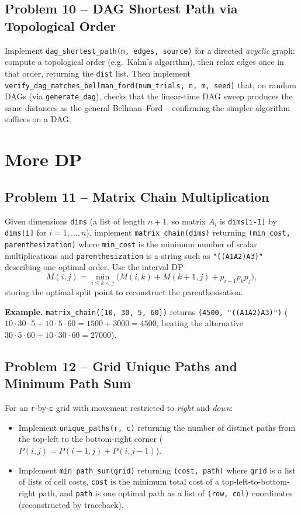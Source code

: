 \documentclass[11pt]{article}
\begin{document}
\subsection*{Problem 10 -- DAG Shortest Path via Topological Order}

Implement \texttt{dag\_shortest\_path(n, edges, source)} for a directed \emph{acyclic} graph:
compute a topological order (e.g.\ Kahn's algorithm), then relax edges once in that order,
returning the \texttt{dist} list. Then implement
\texttt{verify\_dag\_matches\_bellman\_ford(num\_trials, n, m, seed)} that, on random DAGs
(via \texttt{generate\_dag}), checks that the linear-time DAG sweep produces the same
distances as the general Bellman--Ford -- confirming the simpler algorithm suffices on a DAG.

\newpage
\section{More DP}

\subsection*{Problem 11 -- Matrix Chain Multiplication}

Given dimensions \texttt{dims} (a list of length $n+1$, so matrix $A_i$ is
\texttt{dims[i-1]} by \texttt{dims[i]} for $i = 1, \ldots, n$), implement
\texttt{matrix\_chain(dims)} returning \texttt{(min\_cost, parenthesization)} where
\texttt{min\_cost} is the minimum number of scalar multiplications and
\texttt{parenthesization} is a string such as \texttt{"((A1A2)A3)"} describing one optimal
order. Use the interval DP
\[
M(i,j) = \min_{i\le k<j}\big( M(i,k) + M(k+1,j) + p_{i-1}p_k p_j\big),
\]
storing the optimal split point to reconstruct the parenthesisation.

\textbf{Example.} \texttt{matrix\_chain([10, 30, 5, 60])} returns
\texttt{(4500, "((A1A2)A3)")} ($10\cdot30\cdot5 + 10\cdot5\cdot60 = 1500 + 3000 = 4500$,
beating the alternative $30\cdot5\cdot60 + 10\cdot30\cdot60 = 27000$).

\subsection*{Problem 12 -- Grid Unique Paths and Minimum Path Sum}

For an \texttt{r}-by-\texttt{c} grid with movement restricted to \emph{right} and
\emph{down}:
\begin{itemize}
    \item Implement \texttt{unique\_paths(r, c)} returning the number of distinct paths from
    the top-left to the bottom-right corner ($P(i,j) = P(i-1,j) + P(i,j-1)$).
    \item Implement \texttt{min\_path\_sum(grid)} returning \texttt{(cost, path)} where
    \texttt{grid} is a list of lists of cell costs, \texttt{cost} is the minimum total cost
    of a top-left-to-bottom-right path, and \texttt{path} is one optimal path as a list of
    \texttt{(row, col)} coordinates (reconstructed by traceback).
\end{itemize}
\end{document}
